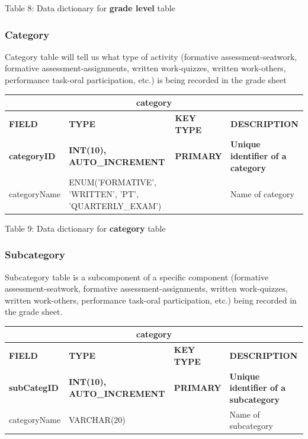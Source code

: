 \documentclass[11pt,a4paper,titlepage]{article}
\begin{document}
\vspace{.5cm}
\begin{center}
    Table 8: Data dictionary for \textbf{grade level} table
\end{center}


\subsubsection{Category}

Category table will tell us what type of activity (formative assessment-seatwork, formative assessment-assignments, written work-quizzes, written work-others, performance task-oral participation, etc.) is being recorded in the grade sheet

\vspace{1cm}
\begin{longtable}{ |p{2.5cm}|p{4.5cm}|p{2.5cm}|p{3cm}|  }
    \hline
    \multicolumn{4}{|c|}{\textbf{category}} \\
    \hline
    \textbf{FIELD}&\textbf{TYPE}&\textbf{KEY TYPE}&\textbf{DESCRIPTION}\\
    \hline
    \textbf{categoryID}  & \textbf{INT(10), AUTO\_INCREMENT} & \textbf{PRIMARY} & \textbf{Unique identifier of a category}\\ \hline
    categoryName & ENUM('FORMATIVE', 'WRITTEN', 'PT', 'QUARTERLY\_EXAM') & & Name of category \\ \hline
\end{longtable}

\vspace{.5cm}
\begin{center}
    Table 9: Data dictionary for \textbf{category} table
\end{center}


\subsubsection{Subcategory}

Subcategory table is a subcomponent of a specific component (formative assessment-seatwork, formative assessment-assignments, written work-quizzes, written work-others, performance task-oral participation, etc.) being recorded in the grade sheet.

\vspace{1cm}
\begin{longtable}{ |p{2.5cm}|p{4.5cm}|p{2.5cm}|p{3cm}|  }
    \hline
    \multicolumn{4}{|c|}{\textbf{category}} \\
    \hline
    \textbf{FIELD}&\textbf{TYPE}&\textbf{KEY TYPE}&\textbf{DESCRIPTION}\\
    \hline
    \textbf{subCategID}  & \textbf{INT(10), AUTO\_INCREMENT} & \textbf{PRIMARY} & \textbf{Unique identifier of a subcategory}\\ \hline
    categoryName & VARCHAR(20) & & Name of subcategory \\ \hline
\end{longtable}
\end{document}
